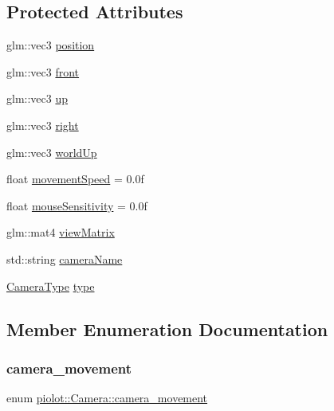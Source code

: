\subsection*{Protected Attributes}
\begin{DoxyCompactItemize}
\item 
glm\+::vec3 \mbox{\hyperlink{classpiolot_1_1_camera_a4552a5cf81a5a8ed249f632e157947a1}{position}}
\item 
glm\+::vec3 \mbox{\hyperlink{classpiolot_1_1_camera_a2adfedf79a032c96798b7d6e01755b5a}{front}}
\item 
glm\+::vec3 \mbox{\hyperlink{classpiolot_1_1_camera_a31ccd695a741d232fa4592d7713de37e}{up}}
\item 
glm\+::vec3 \mbox{\hyperlink{classpiolot_1_1_camera_a20ee1dceb691bb4eefda7a792a6de7c5}{right}}
\item 
glm\+::vec3 \mbox{\hyperlink{classpiolot_1_1_camera_ae722f7d01f68b23b82feb2adb74b90c2}{world\+Up}}
\item 
float \mbox{\hyperlink{classpiolot_1_1_camera_a92aadc4b56ef9667081ecb52b2d7bc42}{movement\+Speed}} = 0.\+0f
\item 
float \mbox{\hyperlink{classpiolot_1_1_camera_ade10b624b272d00a83fdc969da8755f9}{mouse\+Sensitivity}} = 0.\+0f
\item 
glm\+::mat4 \mbox{\hyperlink{classpiolot_1_1_camera_a8f9352500ba36f03f6a384cc28579a95}{view\+Matrix}}
\item 
std\+::string \mbox{\hyperlink{classpiolot_1_1_camera_acada09a9b00303c10c694c386fa05f87}{camera\+Name}}
\item 
\mbox{\hyperlink{namespacepiolot_a8ffac0a73d973fb66879963da5defc90}{Camera\+Type}} \mbox{\hyperlink{classpiolot_1_1_camera_a782c913d63204fd8e22c17111dc1921f}{type}}
\end{DoxyCompactItemize}


\subsection{Member Enumeration Documentation}
\mbox{\label{classpiolot_1_1_camera_afba5e0e4539ee7666e8354842c4988e0}} 
\subsubsection{\texorpdfstring{camera\+\_\+movement}{camera\_movement}}
{\footnotesize\ttfamily enum \mbox{\hyperlink{classpiolot_1_1_camera_afba5e0e4539ee7666e8354842c4988e0}{piolot\+::\+Camera\+::camera\+\_\+movement}}}

